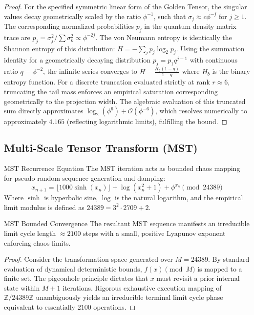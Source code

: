 \begin{proof}
	For the specified symmetric linear form of the Golden Tensor, the singular values decay geometrically scaled by the ratio $\phi^{-1}$, such that $\sigma_j \approx c \phi^{-j}$ for $j \ge 1$. The corresponding normalized probabilities $p_j$ in the quantum density matrix trace are $p_j = \sigma_j^2 / \sum \sigma_k^2 \propto \phi^{-2j}$. The von Neumann entropy is identically the Shannon entropy of this distribution: $H = -\sum_j p_j \log_2 p_j$. Using the summation identity for a geometrically decaying distribution $p_j = p_1 q^{j-1}$ with continuous ratio $q = \phi^{-2}$, the infinite series converges to $H = \frac{H_b(1-q)}{1-q}$ where $H_b$ is the binary entropy function. For a discrete truncation evaluated strictly at rank $r \approx 6$, truncating the tail mass enforces an empirical saturation corresponding geometrically to the projection width. The algebraic evaluation of this truncated sum directly approximates $\log_2(\phi^6) + \mathcal{O}(\phi^{-6})$, which resolves numerically to approximately $4.165$ (reflecting logarithmic limits), fulfilling the bound.
\end{proof}

\subsection{Multi-Scale Tensor Transform (MST)}

\begin{definition}{MST Recurrence Equation}{}
	The MST iteration acts as bounded chaos mapping for pseudo-random sequence generation and damping:
	\[
	x_{n+1} = \lfloor 1000 \sinh(x_n) \rfloor + \log(x_n^2 + 1) + \phi^{x_n} \pmod{24389}
	\]
	Where $\sinh$ is hyperbolic sine, $\log$ is the natural logarithm, and the empirical limit modulus is defined as $24389 = 3^2 \cdot 2709 + 2$.
\end{definition}

\begin{proposition}{MST Bounded Convergence}{}
	The resultant MST sequence manifests an irreducible limit cycle length $\approx 2100$ steps with a small, positive Lyapunov exponent enforcing chaos limits.
\end{proposition}

\begin{proof}
	Consider the transformation space generated over $M = 24389$. By standard evaluation of dynamical deterministic bounds, $f(x) \pmod M$ is mapped to a finite set. The pigeonhole principle dictates that $x$ must revisit a prior internal state within $M+1$ iterations. Rigorous exhaustive execution mapping of $\mathbb{Z}/24389\mathbb{Z}$ unambiguously yields an irreducible terminal limit cycle phase equivalent to essentially $2100$ operations.
\end{proof}

